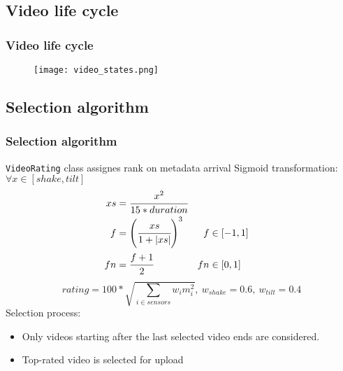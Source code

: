 \subsection{Video life cycle}
\begin{frame}[fragile]	
	\frametitle{Video life cycle}
	\begin{figure}[!t]
		\centering
		\texttt{[image: video\_states.png]}
		\label{fig:states}
	\end{figure}
\end{frame}
\subsection{Selection algorithm}
\begin{frame}	
	\frametitle{Selection algorithm}
	\texttt{VideoRating} class assignes rank on metadata arrival
	Sigmoid transformation: $\forall x \in [shake, tilt]$
	\begin{align*}
		xs &= \cfrac{x^2}{15 * duration} \\
		f  &= \left(\cfrac{xs}{1+|xs|}\right)^3 &f  &\in [-1, 1] \\
		fn &= \cfrac{f + 1}{2}                  &fn &\in [0, 1]
	\end{align*}
	$$rating = 100 * \sqrt{ \sum\limits_{i \in sensors}{w_i m_i^2} },\ w_{shake} = 0.6,\ w_{tilt} = 0.4$$
	Selection process:
	\begin{itemize}
		\item Only videos starting after the last selected video ends are considered.
		\item Top-rated video is selected for upload
	\end{itemize}
\end{frame}